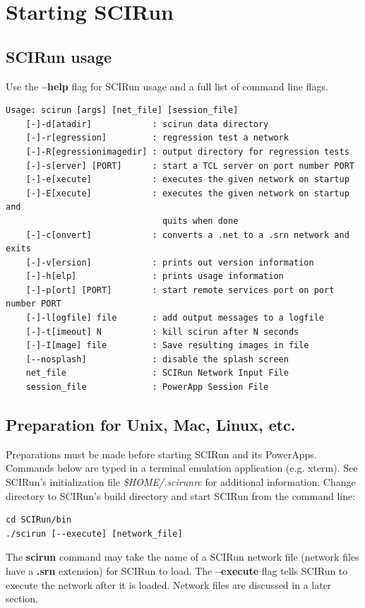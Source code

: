 \documentclass[fleqn,12pt,openany]{book}
\begin{document}
\section{Starting SCIRun}
\subsection{SCIRun usage}
Use the \textbf{--help} flag for SCIRun usage and a full list of command line flags.

\begin{verbatim}
Usage: scirun [args] [net_file] [session_file]
    [-]-d[atadir]            : scirun data directory
    [-]-r[egression]         : regression test a network
    [-]-R[egressionimagedir] : output directory for regression tests
    [-]-s[erver] [PORT]      : start a TCL server on port number PORT
    [-]-e[xecute]            : executes the given network on startup
    [-]-E[xecute]            : executes the given network on startup and
                               quits when done
    [-]-c[onvert]            : converts a .net to a .srn network and exits
    [-]-v[ersion]            : prints out version information
    [-]-h[elp]               : prints usage information
    [-]-p[ort] [PORT]        : start remote services port on port number PORT
    [-]-l[ogfile] file       : add output messages to a logfile
    [-]-t[imeout] N          : kill scirun after N seconds
    [-]-I[mage] file         : Save resulting images in file
    [--nosplash]             : disable the splash screen
    net_file                 : SCIRun Network Input File
    session_file             : PowerApp Session File
\end{verbatim}

\subsection{Preparation for Unix, Mac, Linux, etc.}

Preparations must be made before starting SCIRun and its PowerApps.
Commands below are typed in a terminal emulation application (e.g. xterm).
See SCIRun's initialization file \emph{\$HOME/.scirunrc} for additional information.
Change directory to SCIRun's build directory and start SCIRun from the command line:
  
\begin{verbatim}
cd SCIRun/bin
./scirun [--execute] [network_file]
\end{verbatim}

The \textbf{scirun} command may take the name of a SCIRun network file (network files have a \textbf{.srn} extension) for SCIRun to load.
The \textbf{--execute} flag tells SCIRun to execute the network after it is loaded.
Network files are discussed in a later section.
\end{document}
